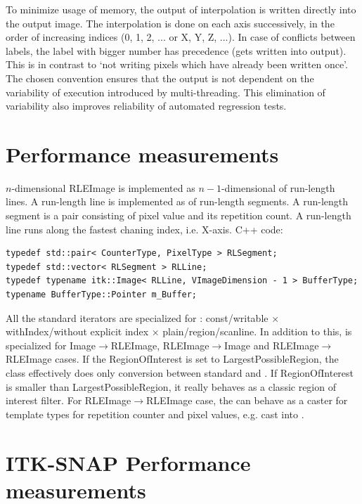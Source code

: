 \documentclass{InsightArticle}
\begin{document}
To minimize usage of memory, the output of interpolation is written
directly into the output image.
The interpolation is done on each axis successively,
in the order of increasing indices (0, 1, 2, ... or X, Y, Z, ...).
In case of conflicts between labels,
the label with bigger number has precedence (gets written into output).
This is in contrast to `not writing pixels which have already been written once'.
The chosen convention ensures that the output is not dependent on the
variability of execution introduced by multi-threading.
This elimination of variability also improves
reliability of automated regression tests.


\section{Performance measurements}

$n$-dimensional RLEImage is implemented as $n-1$-dimensional  of run-length lines.
A run-length line is implemented as  of run-length segments.
A run-length segment is a pair consisting of pixel value and its repetition count.
A run-length line runs along the fastest chaning index, i.e. X-axis. C++ code:

\begin{verbatim}
typedef std::pair< CounterType, PixelType > RLSegment;
typedef std::vector< RLSegment > RLLine;
typedef typename itk::Image< RLLine, VImageDimension - 1 > BufferType;
typename BufferType::Pointer m_Buffer;
\end{verbatim}

All the standard iterators are specialized for :
const/writable $\times$ withIndex/without explicit index $\times$ plain/region/scanline.
In addition to this,  is specialized for
Image$\rightarrow$RLEImage, RLEImage$\rightarrow$Image and RLEImage$\rightarrow$RLEImage cases.
If the RegionOfInterest is set to LargestPossibleRegion, the class effectively
does only conversion between standard  and .
If RegionOfInterest is smaller than LargestPossibleRegion,
it really behaves as a classic region of interest filter.
For RLEImage$\rightarrow$RLEImage case, the 
can behave as a caster for template types for repetition counter and pixel values,
e.g. cast  into .

\section{ITK-SNAP Performance measurements}
\end{document}
